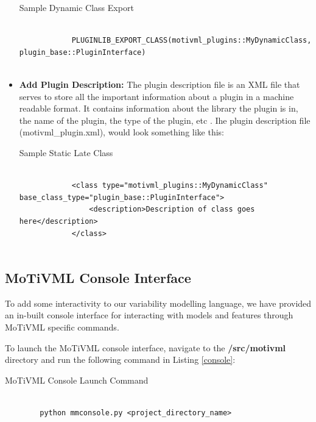 \documentclass{article}
\newenvironment{longlisting}{\captionsetup{type=listing}}{}
\begin{document}
\begin{itemize}
	\begin{longlisting}
		\caption{Sample Dynamic Class Export}
		\begin{verbatim}
			
			PLUGINLIB_EXPORT_CLASS(motivml_plugins::MyDynamicClass, plugin_base::PluginInterface)
			
		\end{verbatim}
		\label{pluginexport}
	\end{longlisting}
	
	\item \textbf{Add Plugin Description: } The plugin description file is an XML file that serves to store all the important information about a plugin in a machine readable format. It contains information about the library the plugin is in, the name of the plugin, the type of the plugin, etc \cite{pluginlib}. Ihe plugin description file (motivml\_plugin.xml), would look something like this:
	
	\begin{longlisting}
		\caption{Sample Static Late Class}
		\begin{verbatim}
			
			<class type="motivml_plugins::MyDynamicClass" base_class_type="plugin_base::PluginInterface">
				<description>Description of class goes here</description>
			</class>
			
		\end{verbatim}
		\label{sampledylatedesc}
	\end{longlisting}
	
\end{itemize}



\subsection{MoTiVML Console Interface}
To add some interactivity to our variability modelling language, we have provided an in-built console interface for interacting with models and features through MoTiVML specific commands.

To launch the MoTiVML console interface, navigate to the \textbf{/src/motivml} directory and run the following command in Listing \ref{console}:

\begin{longlisting}
	\caption{MoTiVML Console Launch Command}
	\begin{verbatim}
		
		python mmconsole.py <project_directory_name>
		
	\end{verbatim}
	\label{console}
\end{longlisting}
\end{document}
